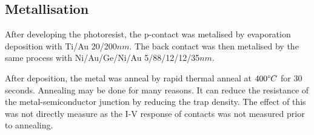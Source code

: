 \subsection{Metallisation}
\label{sec:fab:metallisation}


After developing the photoresist, the p-contact was metalised by evaporation deposition with Ti/Au 20/200$nm$. The back contact was then metalised by the same process with Ni/Au/Ge/Ni/Au 5/88/12/12/35$nm$.

After deposition, the metal was anneal by rapid thermal anneal at $400\degree C$ for 30 seconds. Annealing may be done for many reasons. It can reduce the resistance of the metal-semiconductor junction by reducing the trap density. The effect of this was not directly measure as the I-V response of contacts was not measured prior to annealing. 

